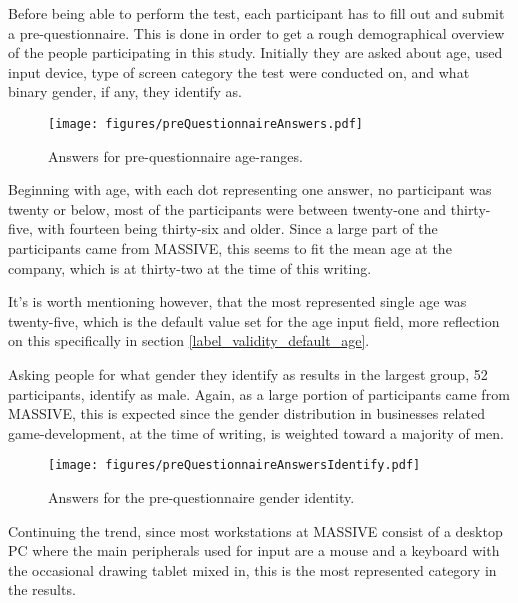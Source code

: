     Before being able to perform the test, each participant has to fill
    out and submit a pre-questionnaire. This is done in order to get
    a rough demographical overview of the people participating in this
    study. Initially they are asked about age, used input device, type of
    screen category the test were conducted on, and what binary gender, if
    any, they identify as.

    \begin{figure}[h!]
      \centering
      \texttt{[image: figures/preQuestionnaireAnswers.pdf]}
      \caption{Answers for pre-questionnaire age-ranges.}
    \end{figure}

    Beginning with age, with each dot representing one answer, no
    participant was twenty or below, most of the  participants were between
    twenty-one and thirty-five, with fourteen being thirty-six and older.
    Since a large part of the participants came from MASSIVE, this seems to
    fit the mean age at the company, which is at thirty-two at
    the time of this writing.

    It's is worth mentioning however, that the most represented single age
    was twenty-five, which is the default value set for the age input
    field, more reflection on this specifically in section
    \ref{label_validity_default_age}.

    Asking people for what gender they identify as results in the largest
    group, 52 participants, identify as male. Again, as a large portion of
    participants came from MASSIVE, this is expected since the gender
    distribution in businesses related game-development, at the time of
    writing, is weighted toward a majority of men\cite[p.16]{citeIndex2019}.

    \begin{figure}[h!]
      \centering
      \texttt{[image: figures/preQuestionnaireAnswersIdentify.pdf]}
      \caption{Answers for the pre-questionnaire gender identity.}
    \end{figure}

    Continuing the trend, since most workstations at MASSIVE consist of a
    desktop PC where the main peripherals used for input are a mouse and a
    keyboard with the occasional drawing tablet mixed in, this is the most
    represented category in the results.


